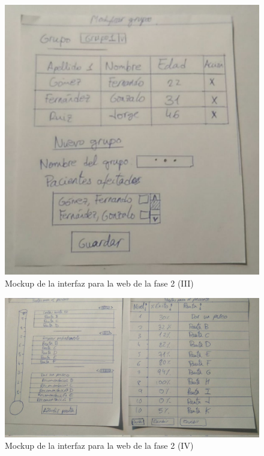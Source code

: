 \begin{figure}[!htbp]
    \centering
    \includegraphics[scale=0.3]{Imagenes/anxA4.jpg}
    \caption[Mockup de la interfaz para la web de la fase 1 (III)]{Mockup de la interfaz para la web de la fase 2 (III)}
    \label{fig:mockup4}
\end{figure}

\begin{figure}[!htbp]
    \centering
    \includegraphics[scale=0.3]{Imagenes/anxA5.jpg}
    \caption[Mockup de la interfaz para la web de la fase 1 (IV)]{Mockup de la interfaz para la web de la fase 2 (IV)}
    \label{fig:mockup5}
\end{figure}

